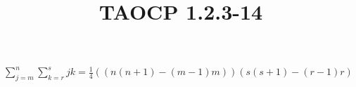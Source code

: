 \documentclass{article}
\title{TAOCP 1.2.3\mbox{-}14}
\begin{document}
\maketitle

\( \sum_{j=m}^{n}\sum_{k=r}^{s} jk = \frac{1}{4}((n(n+1)-(m-1)m))(s(s+1)-(r-1)r) \)
\end{document}
